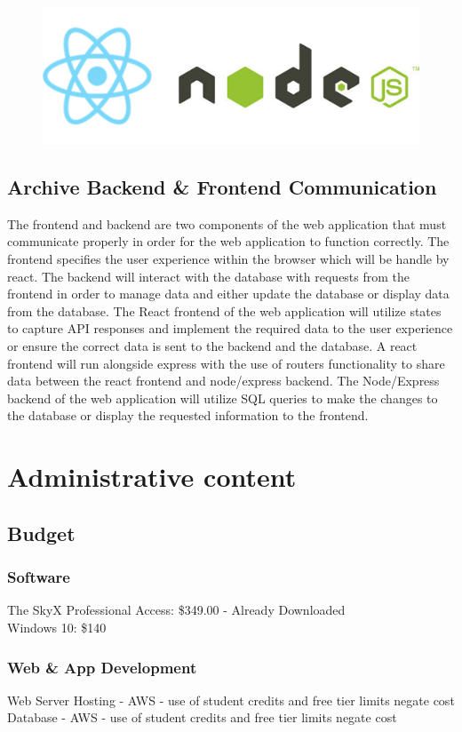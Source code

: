\documentclass[12pt]{report}
\begin{document}
\begin{figure}[h]
	\centering
	\includegraphics[width=0.251\linewidth]{react_node}
\end{figure}

\subsection*{Archive Backend \& Frontend Communication}

The frontend and backend are two components of the web application that must communicate properly in order for the web application to function correctly.  The frontend specifies the user experience within the browser which will be handle by react.  The backend will interact with the database with requests from the frontend in order to manage data and either update the database or display data from the database.
The React frontend of the web application will utilize states to capture API responses and implement the required data to the user experience or ensure the correct data is sent to the backend and the database.  A react frontend will run alongside express with the use of routers functionality to share data between the react frontend and node/express backend.
The Node/Express backend of the web application will utilize SQL queries to make the changes to the database or display the requested information to the frontend.

\section{Administrative content}

\subsection*{Budget}

\subsubsection*{Software}
The SkyX Professional Access: \$349.00 - Already Downloaded\\
Windows 10: \$140

\subsubsection*{Web \& App Development}
Web Server Hosting - AWS - use of student credits and free tier limits negate cost\\
Database - AWS - use of student credits and free tier limits negate cost
\end{document}

